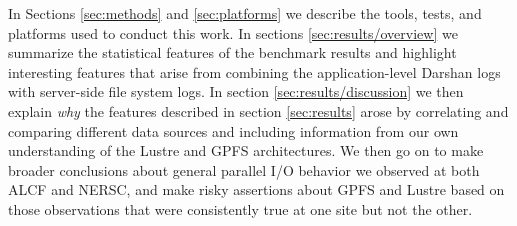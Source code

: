 In Sections \ref{sec:methods} and \ref{sec:platforms} we describe the tools, tests, and
platforms used to conduct this work.  In sections \ref{sec:results/overview} we summarize the
statistical features of the benchmark results and highlight interesting features
that arise from combining the application-level Darshan logs with server-side
file system logs.  In section \ref{sec:results/discussion} we then explain \emph{why} the
features described in section \ref{sec:results} arose by correlating and
comparing different data sources and including information from our own
understanding of the Lustre and GPFS architectures.  We then go on to make
broader conclusions about general parallel I/O behavior we observed at both
ALCF and NERSC, and make risky assertions about GPFS and Lustre based on those
observations that were consistently true at one site but not the other.
